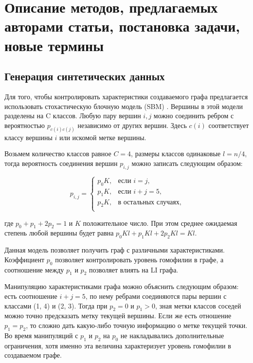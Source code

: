 \documentclass[a4paper,14pt]{article}
\begin{document}
	\pagebreak
	\section{Описание методов, предлагаемых авторами статьи, постановка задачи, новые термины}
	\setcounter{figure}{0}
	
	\subsection{Генерация синтетических данных}
	
	Для того, чтобы контролировать характеристики создаваемого графа предлагается использовать стохастическую блочную модель (SBM) \cite{holland1983stochastic}.
	Вершины в этой модели разделены на C классов.
	Любую пару вершин $i,j$ можно соединить ребром с вероятностью $p_{c(i)c(j)}$  независимо от других вершин.
	Здесь $c(i)$ соответствует классу вершины $i$ или искомой метке вершины.
	
	Возьмем  количество классов равное $C=4$, размеры классов одинаковые $l=n/4$, тогда вероятность соединения вершин $p_{i,j}$ можно записать следующим образом:
	
	$$p_{i,j} = \begin{cases}
		p_0K, & \text{если } i = j,\\
		p_1K, & \text{если } i + j = 5,\\
		p_2K, & \text{в остальных случаях},\\
	\end{cases}$$
	
	где $p_0+p_1+2p_2=1$ и $K$ положительное число.
	При этом среднее ожидаемая степень любой вершины будет равна $p_0 Kl+p_1 Kl+2p_2 Kl=Kl$.
	
	Данная модель позволяет получить граф с различными характеристиками.
	Коэффициент $p_0$ позволяет контролировать уровень гомофилии в графе, а соотношение между $p_1$ и $p_2$ позволяет влиять на LI графа.
	
	Манипуляцию характеристиками графа можно объяснить следующим образом: есть соотношение $i+j=5$, по нему ребрами соединяются пары вершин с классами (1, 4) и (2, 3).
	Тогда при $p_2=0$ и $p_1>0$, зная метки классов соседей можно точно предсказать метку текущей вершины.
	Если же есть отношение $p_1=p_2$, то сложно дать какую-либо точную информацию о метке текущей точки.
	Во время манипуляций с $p_1$ и $p_2$  на $p_0$ не накладывались дополнительные ограничения, хотя именно эта величина характеризует уровень гомофилии в создаваемом графе.
	
\end{document}
